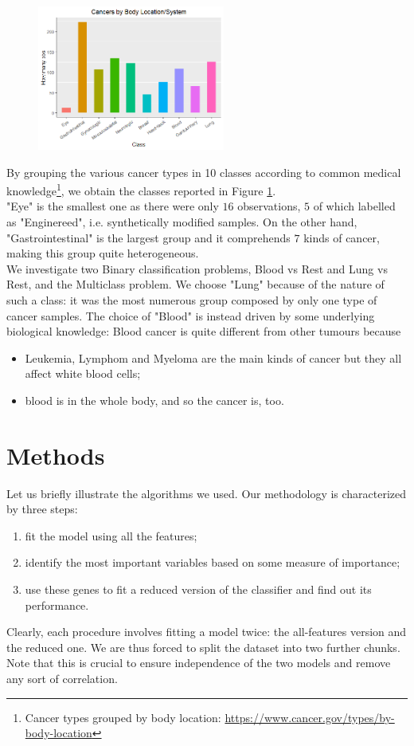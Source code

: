 \documentclass[a4paper,11pt, oneside]{article}  %
\begin{document}
\begin{figure}
	\includegraphics[width=0.55\textwidth]{plot1.png}
	\label{fig1}
\end{figure}
By grouping the various cancer types in 10 classes according to common medical knowledge\footnote{Cancer types grouped by body location: \url{https://www.cancer.gov/types/by-body-location}}, we obtain the classes reported in Figure \ref{fig1}. \\
"Eye" is the smallest one as there were only $16$ observations, $5$ of which labelled as "Enginereed", i.e.  synthetically modified samples. On the other hand, "Gastrointestinal" is the largest group and it comprehends $7$ kinds of cancer,  making this group quite heterogeneous. \\
We investigate two Binary classification problems, Blood vs Rest and Lung vs Rest, and the Multiclass problem. We choose "Lung" because of the nature of such a class: it was the most numerous group composed by only one type of cancer samples. The choice of "Blood" is instead driven by some underlying biological knowledge: Blood cancer is quite different from other tumours because
\begin{itemize}
	\item Leukemia, Lymphom and Myeloma are the main kinds of cancer but they all affect white blood cells;
	\item blood is in the whole body, and so the cancer is, too.
\end{itemize} 

\section{Methods}
Let us briefly illustrate the algorithms we used. Our methodology is characterized by three steps:
\begin{enumerate}
	\item fit the model using all the features;
	\item identify the most important variables based on some measure of importance;
	\item use these genes to fit a reduced version of the classifier and find out its performance.
\end{enumerate}
Clearly, each procedure involves fitting a model twice: the all-features version and the reduced one. We are thus forced to split the dataset into two further chunks. Note that this is crucial to ensure independence of the two models and remove any sort of correlation.
\end{document}
